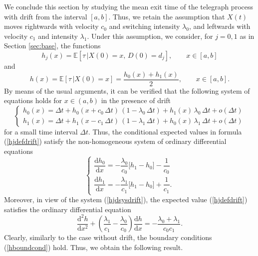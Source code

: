 \documentclass{article}
\begin{document}
We conclude this section by studying the mean exit time of the telegraph process with drift from the interval $[a,b]$. Thus, we retain the assumption that $X(t)$ moves rightwards with velocity $c_0$ and switching intensity $\lambda_0$, and leftwards with velocity $c_1$ and intensity $\lambda_1$. Under this assumption, we consider, for $j=0,1$ as in Section \ref{sec:base}, the functions
\begin{equation}h_j(x)=\mathbb{E}\left[\tau\,\Big\lvert X(0)=x,\,D(0)=d_j\right],\qquad x\in[a,b]\label{hjdefdrift}\end{equation}and
\begin{equation}h(x)=\mathbb{E}\left[\tau\,\Big\lvert X(0)=x\right]=\frac{h_0(x)+h_1(x)}{2},\qquad x\in[a,b].\label{hdefdrift}\end{equation} By means of the usual arguments, it can be verified that the following system of equations holds for $x\in(a,b)$ in the presence of drift
\begin{equation*}
\begin{cases}
h_0(x)=\Delta t+h_0(x+c_0\,\Delta t)\,(1-\lambda_0\,\Delta t)+h_1(x)\,\lambda_0\,\Delta t + o(\Delta t)\\
h_1(x)=\Delta t+h_1(x-c_1\,\Delta t)\,(1-\lambda_1\,\Delta t)+h_0(x)\,\lambda_1\,\Delta t + o(\Delta t)
\end{cases}
\end{equation*}
for a small time interval $\Delta t$. Thus, the conditional expected values in formula (\ref{hjdefdrift}) satisfy the non-homogeneous system of ordinary differential equations
\begin{equation}\label{hjdsysdrift}
\begin{cases}
\dfrac{\mathrm{d} h_0}{\mathrm{d}x}=-\dfrac{\lambda_0}{c_0}\big[h_1-h_0\big]-\dfrac{1}{c_0}\\[0.75em]
\dfrac{\mathrm{d} h_1}{\mathrm{d}x}=-\dfrac{\lambda_1}{c_1}\big[h_1-h_0\big]+\dfrac{1}{c_1}.
\end{cases}
\end{equation}
Moreover, in view of the system (\ref{hjdsysdrift}), the expected value (\ref{hjdefdrift}) satisfies the ordinary differential equation
\begin{equation}\label{hodedrift}\dfrac{\mathrm{d}^2 h}{\mathrm{d}x^2}+\left(\frac{\lambda_1}{c_1}-\frac{\lambda_0}{c_0}\right)\dfrac{\mathrm{d} h}{\mathrm{d}x}=-\frac{\lambda_0+\lambda_1}{c_0c_1}.\end{equation}
Clearly, similarly to the case without drift, the boundary conditions (\ref{hboundcond}) hold. Thus, we obtain the following result.
\end{document}
